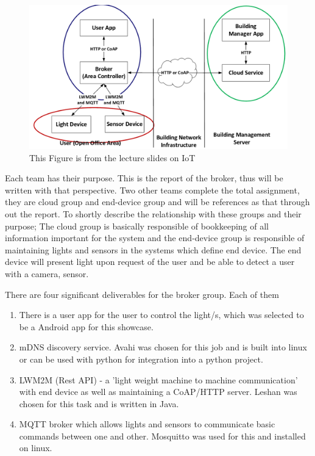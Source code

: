 \documentclass[conference]{IEEEtran}
\begin{document}
\begin{figure}[h]
	\begin{center}
		\includegraphics[width=1\linewidth]{img/design}
		\caption{This Figure is from the lecture slides on IoT \cite{slides}}
		\label{fig:fig1}
	\end{center}
\end{figure}

Each team has their purpose. This is the report of the broker, thus will be written with that perspective. Two other teams complete the total assignment, they are cloud group and end-device group and will be references as that through out the report. To shortly describe the relationship with these groups and their purpose; The cloud group is basically responsible of bookkeeping of all information important for the system and the end-device group is responsible of maintaining lights and sensors in the systems which define end device. The end device will present light upon request of the user and be able to detect a user with a camera, sensor.

There are four significant deliverables for the broker group. Each of them 
\begin{enumerate}
\item There is a user app for the user to control the light/s, which was selected to be a Android app for this showcase.
\item mDNS discovery service. Avahi was chosen for this job and is built into linux or can be used with python for integration into a python project.
\item LWM2M (Rest API) - a 'light weight machine to machine communication' with end device as well as maintaining a CoAP/HTTP server. Leshan was chosen for this task and is written in Java.
\item MQTT broker which allows lights and sensors to communicate basic commands between one and other. Mosquitto was used for this and installed on linux.
\end{enumerate}
\end{document}
